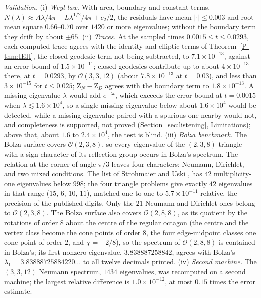 \documentclass[pdflatex,sn-mathphys-num]{sn-jnl}
\newcommand{\Orb}{\mathcal{O}}
\newcommand{\cZ}{\mathrm{Z}}
\newcommand{\pref}[1]{\ref*{P-#1}}%
\theoremstyle{thmstyleone}%
\theoremstyle{thmstylethree}%
\providecommand{\Orb}{\mathcal{O}}
\providecommand{\cZ}{\mathrm{Z}}
\begin{document}
\emph{Validation.} (i) \emph{Weyl law.} With area, boundary and constant terms, $N(\lambda)\approx A\lambda/4\pi\pm L\lambda^{1/2}/4\pi+c_2/2$, the residuals have mean $|{\cdot}|\le0.003$ and root mean square $0.66$--$0.70$ over $1420$ or more eigenvalues; without the boundary term they drift by about $\pm65$. (ii) \emph{Traces.} At the sampled times $0.0015\le t\le0.0293$, each computed trace agrees with the identity and elliptic terms of Theorem~\pref{thm:IEH}, the closed-geodesic term not being subtracted, to $7.1\times10^{-13}$, against an error bound of $1.5\times10^{-11}$; closed geodesics contribute up to about $4\times10^{-13}$ there, at $t=0.0293$, by $\Orb(3,3,12)$ (about $7.8\times10^{-13}$ at $t=0.03$), and less than $3\times10^{-15}$ for $t\le0.025$; $\cZ_N-\cZ_D$ agrees with the boundary term to $1.8\times10^{-13}$. A missing eigenvalue $\lambda$ would add $e^{-\lambda t}$, which exceeds the error bound at $t=0.0015$ when $\lambda\lesssim1.6\times10^4$, so a single missing eigenvalue below about $1.6\times10^4$ would be detected, while a missing eigenvalue paired with a spurious one nearby would not, and completeness is supported, not proved (Section~\ref{sec:listening}, Limitations); above that, about $1.6$ to $2.4\times10^4$, the test is blind. (iii) \emph{Bolza benchmark.} The Bolza surface covers $\Orb(2,3,8)$, so every eigenvalue of the $(2,3,8)$ triangle with a sign character of its reflection group occurs in Bolza's spectrum. The relation at the corner of angle $\pi/3$ leaves four characters: Neumann, Dirichlet, and two mixed conditions. The list of Strohmaier and Uski \cite[\S7.1 and the ancillary file of arXiv:1110.2150v4]{strohmaieruski2013}, \cite{strohmaieruski2018} has $42$ multiplicity-one eigenvalues below $998$; the four triangle problems give exactly $42$ eigenvalues in that range ($15$, $6$, $10$, $11$), matched one-to-one to $5.7\times10^{-11}$ relative, the precision of the published digits. Only the $21$ Neumann and Dirichlet ones belong to $\Orb(2,3,8)$. The Bolza surface also covers $\Orb(2,8,8)$, as its quotient by the rotations of order $8$ about the centre of the regular octagon (the centre and the vertex class become the cone points of order $8$, the four edge-midpoint classes one cone point of order $2$, and $\chi=-2/8$), so the spectrum of $\Orb(2,8,8)$ is contained in Bolza's; its first nonzero eigenvalue, $3.838887258842$, agrees with Bolza's $\lambda_1=3.83888725884220\ldots$ \cite{strohmaieruski2013} to all twelve decimals printed. (iv) \emph{Second machine.} The $(3,3,12)$ Neumann spectrum, $1434$ eigenvalues, was recomputed on a second machine; the largest relative difference is $1.0\times10^{-12}$, at most $0.15$ times the error estimate.
\end{document}
